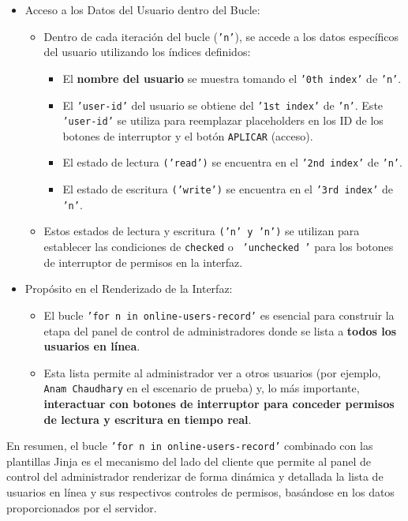\documentclass{report}
\begin{document}
\begin{itemize}
    \item Acceso a los Datos del Usuario dentro del Bucle:
    \begin{itemize}
        \item Dentro de cada iteración del bucle (\texttt{'n'}), se accede a los datos específicos del usuario utilizando los índices definidos:
        \begin{itemize}
            \item El \textbf{nombre del usuario} se muestra tomando el \texttt{'0th index'} de \texttt{'n'}.
            \item El \texttt{'user-id'} del usuario se obtiene del \texttt{'1st index'} de \texttt{'n'}. Este \texttt{'user-id'} se utiliza para 
            reemplazar placeholders en los ID de los botones de interruptor y el botón \texttt{APLICAR} (acceso).
            \item El estado de lectura \texttt{('read')} se encuentra en el \texttt{'2nd index'} de \texttt{'n'}.
            \item El estado de escritura \texttt{('write')} se encuentra en el \texttt{'3rd index'} de \texttt{'n'}.
        \end{itemize}
        \item Estos estados de lectura y escritura \texttt{('n' y 'n')} se utilizan para establecer las condiciones de \texttt{checked} o 
        \texttt{ 'unchecked '} para los botones de interruptor de permisos en la interfaz.    
    \end{itemize}

    \item Propósito en el Renderizado de la Interfaz:
    \begin{itemize}
        \item El bucle \texttt{'for n in online-users-record'} es esencial para construir la etapa del panel de control de administradores donde se lista 
        a \textbf{todos los usuarios en línea}.
        \item Esta lista permite al administrador ver a otros usuarios (por ejemplo, \texttt{Anam Chaudhary} en el escenario de prueba) y, lo más 
        importante, \textbf{interactuar con botones de interruptor para conceder permisos de lectura y escritura en tiempo real}.    
    \end{itemize}
\end{itemize}

En resumen, el bucle \texttt{'for n in online-users-record'} combinado con las plantillas Jinja es el mecanismo del lado del cliente que permite 
al panel de control del administrador renderizar de forma dinámica y detallada la lista de usuarios en línea y sus respectivos controles de permisos, 
basándose en los datos proporcionados por el servidor.
\end{document}
